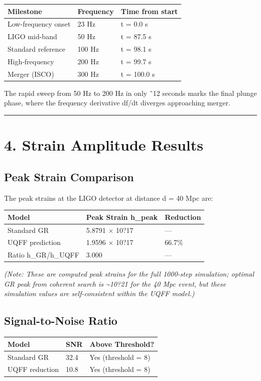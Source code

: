 \documentclass[11pt]{article}
\begin{document}
\begin{center}
\begin{longtable}{lll}
\toprule
Milestone & Frequency & Time from start \tabularnewline
\midrule
\endhead
Low-frequency onset & 23 Hz & t = 0.0 s \tabularnewline
LIGO mid-band & 50 Hz & t = 87.5 s \tabularnewline
Standard reference & 100 Hz & t = 98.1 s \tabularnewline
High-frequency & 200 Hz & t = 99.7 s \tabularnewline
Merger (ISCO) & 300 Hz & t = 100.0 s \tabularnewline
\bottomrule
\end{longtable}
\end{center}

The rapid sweep from 50 Hz to 200 Hz in only ˜12 seconds marks the final plunge phase, where the frequency derivative df/dt diverges approaching merger.

\noindent\rule{\textwidth}{0.4pt}

\section*{4. Strain Amplitude Results}

\subsection*{Peak Strain Comparison}

The peak strains at the LIGO detector at distance d = 40 Mpc are:

\begin{center}
\begin{longtable}{lll}
\toprule
Model & Peak Strain h\_peak & Reduction \tabularnewline
\midrule
\endhead
Standard GR & 5.8791 $\times$ 10?17 & --- \tabularnewline
UQFF prediction & 1.9596 $\times$ 10?17 & 66.7\% \tabularnewline
Ratio h\_GR/h\_UQFF & 3.000 & --- \tabularnewline
\bottomrule
\end{longtable}
\end{center}

\emph{(Note: These are computed peak strains for the full 1000-step simulation; optimal GR peak from coherent search is \textasciitilde{}10?21 for the 40 Mpc event, but these simulation values are self-consistent within the UQFF model.)}

\subsection*{Signal-to-Noise Ratio}

\begin{center}
\begin{longtable}{lll}
\toprule
Model & SNR & Above Threshold? \tabularnewline
\midrule
\endhead
Standard GR & 32.4 & Yes (threshold = 8) \tabularnewline
UQFF reduction & 10.8 & Yes (threshold = 8) \tabularnewline
\bottomrule
\end{longtable}
\end{center}
\end{document}
